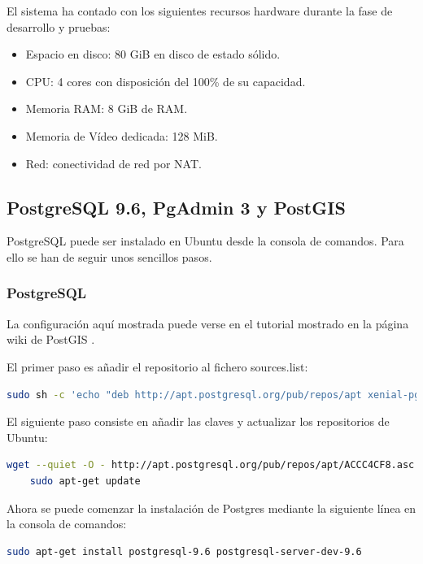 El sistema ha contado con los siguientes recursos hardware durante la fase de desarrollo y pruebas:

\begin{itemize}
	\item Espacio en disco: 80 GiB en disco de estado sólido.
	\item CPU: 4 cores con disposición del 100\% de su capacidad.
	\item Memoria RAM: 8 GiB de RAM.
	\item Memoria de Vídeo dedicada: 128 MiB.
	\item Red: conectividad de red por NAT.
\end{itemize}


\subsection{PostgreSQL 9.6, PgAdmin 3 y PostGIS}
PostgreSQL puede ser instalado en Ubuntu desde la consola de comandos. Para ello se han de seguir unos sencillos pasos.

\subsubsection{PostgreSQL}

La configuración aquí mostrada puede verse en el tutorial mostrado en la página wiki de PostGIS \cite{installpost:info}.

El primer paso es añadir el repositorio al fichero sources.list:

\begin{lstlisting}[language=bash]
  sudo sh -c 'echo "deb http://apt.postgresql.org/pub/repos/apt xenial-pgdg main" >> /etc/apt/sources.list'
\end{lstlisting}

El siguiente paso consiste en añadir las claves y actualizar los repositorios de Ubuntu:

\begin{lstlisting}[language=bash]
	wget --quiet -O - http://apt.postgresql.org/pub/repos/apt/ACCC4CF8.asc | sudo apt-key add -
	sudo apt-get update
\end{lstlisting}

Ahora se puede comenzar la instalación de Postgres mediante la siguiente línea en la consola de comandos:
\begin{lstlisting}[language=bash]
	sudo apt-get install postgresql-9.6 postgresql-server-dev-9.6
\end{lstlisting}

